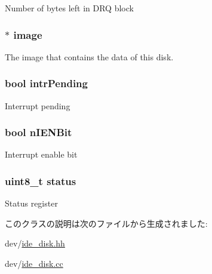 \label{classIdeDisk_a93e2e2892d126eac3ce8dbb514d44c31}
Number of bytes left in DRQ block \hypertarget{classIdeDisk_a86d47120637a95e3a6876c774d768030}{
\subsubsection[{image}]{$\ast$ {\bf image}}}
\label{classIdeDisk_a86d47120637a95e3a6876c774d768030}
The image that contains the data of this disk. \hypertarget{classIdeDisk_aabb849037e6d1c429d270d7fd20e958f}{
\subsubsection[{intrPending}]{\setlength{\rightskip}{0pt plus 5cm}bool {\bf intrPending}}}
\label{classIdeDisk_aabb849037e6d1c429d270d7fd20e958f}
Interrupt pending \hypertarget{classIdeDisk_ad58649fd94c5f762267f1d7bf682f6ca}{
\subsubsection[{nIENBit}]{\setlength{\rightskip}{0pt plus 5cm}bool {\bf nIENBit}}}
\label{classIdeDisk_ad58649fd94c5f762267f1d7bf682f6ca}
Interrupt enable bit \hypertarget{classIdeDisk_ade818037fd6c985038ff29656089758d}{
\subsubsection[{status}]{\setlength{\rightskip}{0pt plus 5cm}uint8\_\-t {\bf status}}}
\label{classIdeDisk_ade818037fd6c985038ff29656089758d}
Status register 

このクラスの説明は次のファイルから生成されました:\begin{DoxyCompactItemize}
\item 
dev/\hyperlink{ide__disk_8hh}{ide\_\-disk.hh}\item 
dev/\hyperlink{ide__disk_8cc}{ide\_\-disk.cc}\end{DoxyCompactItemize}
